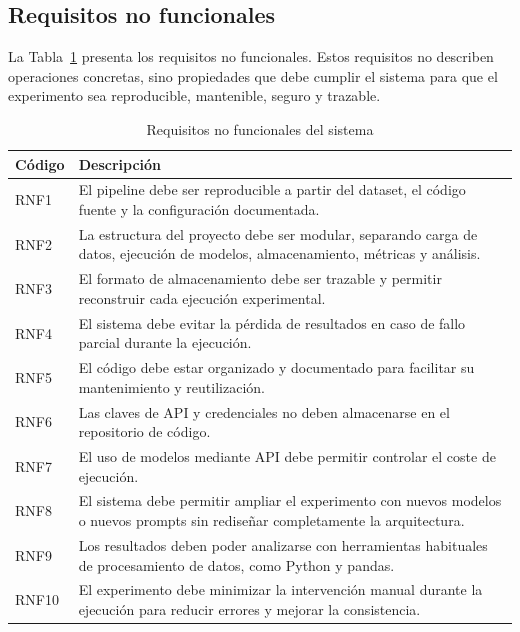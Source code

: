\documentclass[12pt]{report} %
\renewcommand{\_}{\oldunderscore\allowbreak}
\begin{document}
\subsection{Requisitos no funcionales}

La Tabla~\ref{tab:requisitos_no_funcionales} presenta los requisitos no funcionales. Estos requisitos no describen operaciones concretas, sino propiedades que debe cumplir el sistema para que el experimento sea reproducible, mantenible, seguro y trazable.

\begin{table}[H]
\centering
\begin{tabular}{p{2cm}p{11cm}}
\hline
\textbf{Código} & \textbf{Descripción} \\
\hline
RNF1 & El pipeline debe ser reproducible a partir del dataset, el código fuente y la configuración documentada. \\
RNF2 & La estructura del proyecto debe ser modular, separando carga de datos, ejecución de modelos, almacenamiento, métricas y análisis. \\
RNF3 & El formato de almacenamiento debe ser trazable y permitir reconstruir cada ejecución experimental. \\
RNF4 & El sistema debe evitar la pérdida de resultados en caso de fallo parcial durante la ejecución. \\
RNF5 & El código debe estar organizado y documentado para facilitar su mantenimiento y reutilización. \\
RNF6 & Las claves de API y credenciales no deben almacenarse en el repositorio de código. \\
RNF7 & El uso de modelos mediante API debe permitir controlar el coste de ejecución. \\
RNF8 & El sistema debe permitir ampliar el experimento con nuevos modelos o nuevos prompts sin rediseñar completamente la arquitectura. \\
RNF9 & Los resultados deben poder analizarse con herramientas habituales de procesamiento de datos, como Python y pandas. \\
RNF10 & El experimento debe minimizar la intervención manual durante la ejecución para reducir errores y mejorar la consistencia. \\
\hline
\end{tabular}
\caption{Requisitos no funcionales del sistema}
\label{tab:requisitos_no_funcionales}
\end{table}

\end{document}
